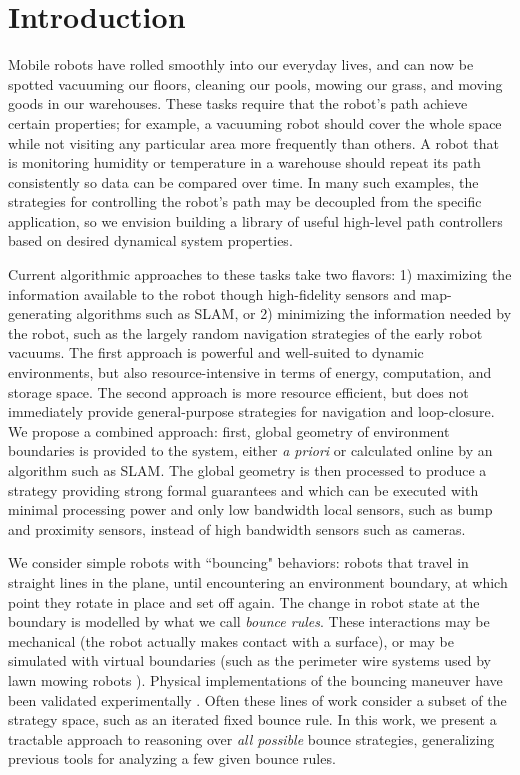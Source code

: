 \documentclass[]{styles/svproc}  %
\begin{document}
\section{Introduction}

Mobile robots have rolled smoothly into our everyday lives, and can now be
spotted vacuuming our floors, cleaning our pools, mowing our grass, and moving
goods in our warehouses. These tasks require that the robot's path achieve certain properties; for example, a 
vacuuming robot should cover the whole space while not visiting 
any particular area more frequently than others. A robot that is monitoring
humidity or temperature in a warehouse should repeat its path consistently so data 
can be compared over time. In many such examples, the strategies for controlling 
the robot's path may be decoupled from the specific application, so we envision building a
library of useful high-level path controllers based on desired dynamical system
properties.

Current algorithmic approaches to these tasks take two flavors: 1) maximizing
the information available to the robot though high-fidelity sensors and
map-generating algorithms such as SLAM, or 2) minimizing the information needed
by the robot, such as the largely random navigation strategies of the early
robot vacuums. The first approach is powerful and well-suited to dynamic
environments, but also resource-intensive in terms of energy, computation, and
storage space. The second approach is more resource efficient, but does not
immediately provide general-purpose strategies for navigation and loop-closure.
We propose a combined approach: first, global geometry of environment boundaries
is provided to the system, either \emph{a priori} or calculated online by an
algorithm such as SLAM. The global geometry is then processed to produce a
strategy providing strong formal guarantees and which can be executed with
minimal processing power and only low bandwidth local sensors, such as bump and
proximity sensors, instead of high bandwidth sensors such as cameras.

We consider simple robots with ``bouncing" behaviors: robots that
travel in straight lines in the plane, until encountering an environment
boundary, at which point they rotate in place and set off again. The change in
robot state at the boundary is modelled by what we call {\em bounce rules}.
These interactions may be mechanical (the robot actually makes contact with a
surface), or may be simulated with
virtual boundaries (such as the perimeter wire systems used by lawn mowing robots
\cite{sahin2007household}). Physical implementations of the bouncing maneuver have
been validated experimentally \cite{alam2018space,LewOKa13}.
Often these lines of work consider a subset of the strategy space, such as an iterated fixed bounce rule. In this work, 
we present a tractable approach to reasoning over {\em all possible} bounce strategies,
generalizing previous tools for analyzing a few given bounce rules.
\end{document}
